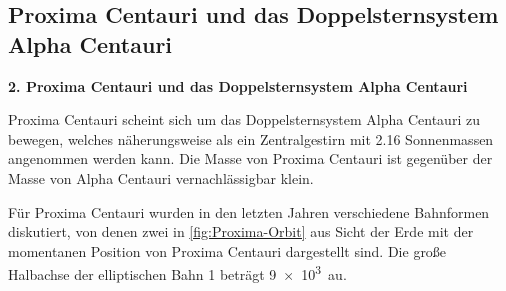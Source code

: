 \subsection{Proxima Centauri und das Doppelsternsystem Alpha Centauri}

\begin{aufgabe}[sidebyside, sidebyside align = top,righthand width=3cm]
	\textbf{2. Proxima Centauri und das Doppelsternsystem Alpha Centauri}\newline
	
	Proxima Centauri scheint sich um das Doppelsternsystem Alpha Centauri zu bewegen, welches näherungsweise als ein Zentralgestirn mit \num{2.16} Sonnenmassen angenommen werden kann. Die Masse von Proxima Centauri ist gegenüber der Masse von Alpha Centauri vernachlässigbar klein.

	Für Proxima Centauri wurden in den letzten Jahren verschiedene Bahnformen diskutiert, von denen zwei in \cref{fig:Proxima-Orbit} aus Sicht der Erde mit der momentanen Position von Proxima Centauri dargestellt sind. Die große Halbachse der elliptischen Bahn 1 beträgt \SI{9e3}{\astronomicalunit}.
	


\end{aufgabe}
